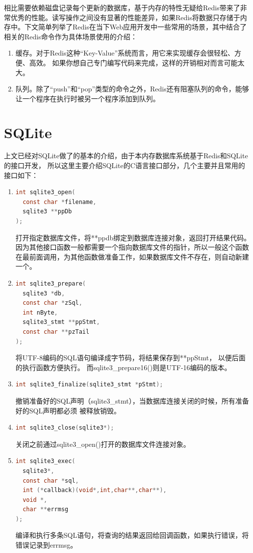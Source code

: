 \documentclass{zjutthesis}
\begin{document}
相比需要依赖磁盘记录每个更新的数据库，基于内存的特性无疑给Redis带来了非常优秀的性能\cite{ref:13}。读写操作之间没有显著的性能差异，如果Redis将数据只存储于内存中。下文简单列举了Redis在当下Web应用开发中一些常用的场景，其中结合了相关的Redis命令作为具体场景使用的介绍：

\begin{enumerate}[label=（\arabic*）]

\item{缓存。对于Redis这种“Key-Value”系统而言，用它来实现缓存会很轻松、方便、高效。
如果你想自己专门编写代码来完成，这样的开销相对而言可能太大。}

\item{队列。除了“push”和“pop”类型的命令之外，Redis还有阻塞队列的命令，能够让一个程序在执行时被另一个程序添加到队列。}

\end{enumerate}

\section{SQLite}
上文已经对SQLite做了的基本的介绍，由于本内存数据库系统基于Redis和SQLite的接口开发， 所以这里主要介绍SQLite的C语言接口部分，几个主要并且常用的接口如下：
\begin{enumerate}[label=（\arabic*）]
\item{
\begin{lstlisting}[language=C]
int sqlite3_open(
  const char *filename,
  sqlite3 **ppDb
);
\end{lstlisting}
打开指定数据库文件，将**ppdb绑定到数据库连接对象，返回打开结果代码。因为其他接口函数一般都需要一个指向数据库文件的指针，所以一般这个函数在最前面调用，为其他函数做准备工作，如果数据库文件不存在，则自动新建一个。
}
\item{
\begin{lstlisting}[language=C]
int sqlite3_prepare(
  sqlite3 *db,
  const char *zSql,
  int nByte,
  sqlite3_stmt **ppStmt,
  const char **pzTail
);
\end{lstlisting}
将UTF-8编码的SQL语句编译成字节码，将结果保存到**ppStmt，
以便后面的执行函数方便执行。
而sqlite3\_prepare16()则是UTF-16编码的版本。
}
\item{
\begin{lstlisting}[language=C]
int sqlite3_finalize(sqlite3_stmt *pStmt);
\end{lstlisting}
撤销准备好的SQL声明（sqlite3\_stmt），当数据库连接关闭的时候，所有准备好的SQL声明都必须
被释放销毁。
}
\item{
\begin{lstlisting}[language=C]
int sqlite3_close(sqlite3*);
\end{lstlisting}
关闭之前通过sqlite3\_open()打开的数据库文件连接对象。
}
\item{
\begin{lstlisting}[language=C]
int sqlite3_exec(
  sqlite3*,
  const char *sql,
  int (*callback)(void*,int,char**,char**),
  void *,
  char **errmsg
);
\end{lstlisting}
编译和执行多条SQL语句，将查询的结果返回给回调函数，如果执行错误，将错误记录到errmsg。
}
\end{enumerate}
\end{document}
